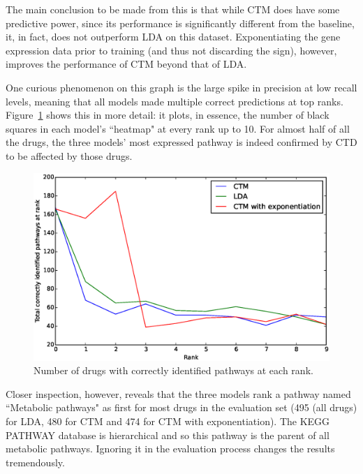 \documentclass[12pt,a4paper,twoside,openright]{report}
\begin{document}
The main conclusion to be made from this is that while CTM does have some predictive power, since its performance is significantly different from the baseline, it, in fact, does not outperform LDA on this dataset. Exponentiating the gene expression data prior to training (and thus not discarding the sign), however, improves the performance of CTM beyond that of LDA.

One curious phenomenon on this graph is the large spike in precision at low recall levels, meaning that all models made multiple correct predictions at top ranks. Figure~\ref{fig:ctd-side-plot-10} shows this in more detail: it plots, in essence, the number of black squares in each model's ``heatmap" at every rank up to 10. For almost half of all the drugs, the three models' most expressed pathway is indeed confirmed by CTD to be affected by those drugs.

\begin{figure}[!htb]
\includegraphics[width=\textwidth]{ctd-side-plot-10.eps}
\caption{Number of drugs with correctly identified pathways at each rank.}
\label{fig:ctd-side-plot-10}
\end{figure}

Closer inspection, however, reveals that the three models rank a pathway named ``Metabolic pathways" as first for most drugs in the evaluation set (495 (all drugs) for LDA, 480 for CTM and 474 for CTM with exponentiation). The KEGG PATHWAY database is hierarchical and so this pathway is the parent of all metabolic pathways. Ignoring it in the evaluation process changes the results tremendously.
\end{document}
